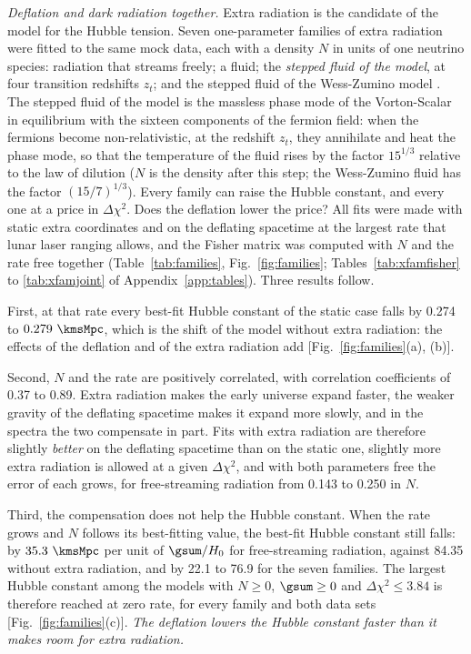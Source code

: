 \emph{Deflation and dark radiation together.} Extra radiation is the candidate of the model for the
Hubble tension. Seven one-parameter families of extra radiation were fitted to the same mock data,
each with a density $N$ in units of one neutrino species: radiation that streams freely; a fluid;
the \emph{stepped fluid of the model}, at four transition redshifts $z_t$; and the stepped fluid of
the Wess-Zumino model \cite{Aloni2022}. The stepped fluid of the model is the massless phase mode of
the Vorton-Scalar in equilibrium with the sixteen components of the fermion field: when the
fermions become non-relativistic, at the redshift $z_t$, they annihilate and heat the phase mode, so
that the temperature of the fluid rises by the factor $15^{1/3}$ relative to the law of dilution
($N$ is the density after this step; the Wess-Zumino fluid has the factor $(15/7)^{1/3}$). Every
family can raise the Hubble constant, and every one at a price in $\Delta\chi^{2}$. Does the
deflation lower the price? All fits were made with static extra coordinates and on the deflating
spacetime at the largest rate that lunar laser ranging allows, and the Fisher matrix was computed
with $N$ and the rate free together (Table~\ref{tab:families}, Fig.~\ref{fig:families};
Tables~\ref{tab:xfamfisher} to \ref{tab:xfamjoint} of Appendix~\ref{app:tables}). Three
results follow.

First, at that rate every best-fit Hubble constant of the static case falls by 0.274 to
$0.279~\kmsMpc$, which is the shift of the model without extra radiation: the effects of the
deflation and of the extra radiation add [Fig.~\ref{fig:families}(a), (b)].

Second, $N$ and the rate are positively correlated, with correlation coefficients of 0.37 to 0.89.
Extra radiation makes the early universe expand faster, the weaker gravity of the deflating
spacetime makes it expand more slowly, and in the spectra the two compensate in part. Fits with
extra radiation are therefore slightly \emph{better} on the deflating spacetime than on the static
one, slightly more extra radiation is allowed at a given $\Delta\chi^{2}$, and with both parameters
free the error of each grows, for free-streaming radiation from 0.143 to 0.250 in $N$.

Third, the compensation does not help the Hubble constant. When the rate grows and $N$ follows its
best-fitting value, the best-fit Hubble constant still falls: by $35.3~\kmsMpc$ per unit of
$\gsum/H_0$ for free-streaming radiation, against 84.35 without extra radiation, and by 22.1 to 76.9
for the seven families. The largest Hubble constant among the models with $N\ge0$, $\gsum\ge0$ and
$\Delta\chi^{2}\le3.84$ is therefore reached at zero rate, for every family and both data sets
[Fig.~\ref{fig:families}(c)]. \emph{The deflation lowers the Hubble constant faster than it makes
room for extra radiation.}

